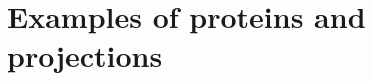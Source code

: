 



\newpage
\section{Examples of proteins and projections}\label{apx:protein-atomic-model-density-map-projections}


